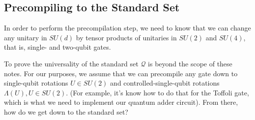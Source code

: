\documentclass{article}
\theoremstyle{plain}
\newtheorem{theorem}{Theorem}
\begin{document}
\subsection{Precompiling to the Standard Set}
\label{subsec:precompile}

In order to perform the precompilation step, we need to know that we can
change any unitary in $SU(d)$ by tensor products of unitaries in $SU(2)$
and $SU(4)$, that is, single- and two-qubit gates.

To prove the universality of the standard set $\mathcal{Q}$ is beyond the
scope of these notes. For our purposes, we assume that we can precompile
any gate down to single-qubit rotations $U \in SU(2)$ and
controlled-single-qubit rotations $\Lambda(U), U\in SU(2)$.
(For example, it's know how to do that for the Toffoli gate, which is what we
need to implement our quantum adder circuit).
From there, how do we get down to the standard set?

%
%
%
\end{document}
